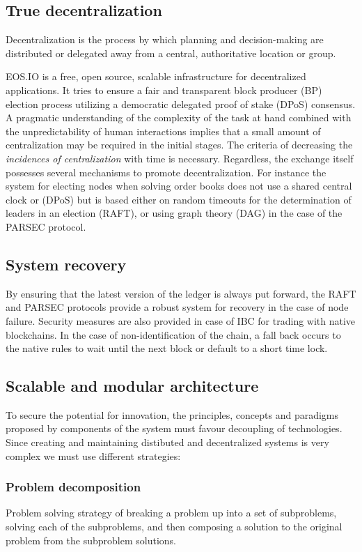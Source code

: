 \documentclass[]{article}
\begin{document}
	\subsection{True decentralization}
	 Decentralization is the process by which planning and decision-making are distributed or delegated away 
	 from a central, authoritative location or group.
	 
	 EOS.IO is a free, open source, scalable infrastructure for decentralized applications. 
	 It tries to ensure a fair and transparent block producer (BP) election process 
	 utilizing a democratic delegated proof of stake (DPoS) consensus.
	 A pragmatic understanding of the complexity of the task at hand combined with the unpredictability of human interactions 
	 implies that a small amount of centralization may be required in the initial stages.
	 The criteria of decreasing the \textit{incidences of centralization} with time is necessary. 	 
	 Regardless, the exchange itself possesses several mechanisms to promote decentralization. 
	 For instance the system for electing nodes when solving order books does not use a shared central clock or (DPoS) 
	 but is based either on random timeouts for the determination of leaders in an election (RAFT), 
	 or using graph theory (DAG) in the case of the PARSEC protocol.
	 
	\subsection{System recovery}
	By ensuring that the latest version of the ledger is always put forward, 
	the RAFT and PARSEC protocols provide a robust system for recovery in the case of node failure.
	Security measures are also provided in case of IBC for trading with native blockchains. 
	In the case of non-identification of the chain, a fall back occurs to the native rules to wait until the next block or default to a short time lock.
	
	\subsection{Scalable and modular architecture}
	To secure the potential for innovation, the principles, 
	concepts and paradigms proposed by components of the system
	must favour decoupling of technologies. 
	Since creating and maintaining distibuted and decentralized systems
	is very complex we must use different strategies: 
	\subsubsection{Problem decomposition}
	Problem solving strategy of breaking a problem up into a set of subproblems, solving each of the subproblems, 
	and then composing a solution to the original problem from the subproblem solutions.
\end{document}
